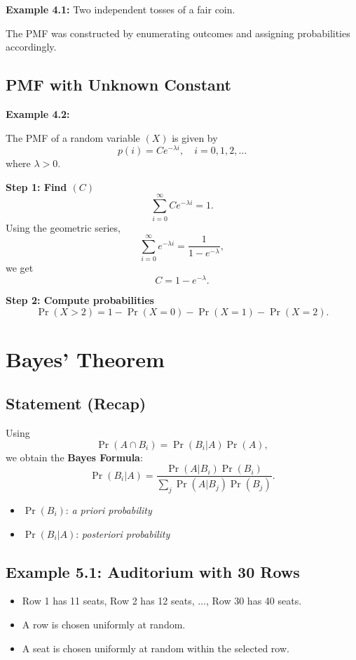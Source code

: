 \documentclass[11pt]{article}
\begin{document}
\textbf{Example 4.1:} Two independent tosses of a fair coin.

The PMF was constructed by enumerating outcomes and assigning probabilities
accordingly.

\subsection{PMF with Unknown Constant}

\textbf{Example 4.2:}

The PMF of a random variable $(X)$ is given by
\[
p(i) = C e^{-\lambda i}, \quad i = 0,1,2,\ldots
\]
where $\lambda > 0$.

\textbf{Step 1: Find $(C)$}
\[
\sum_{i=0}^{\infty} C e^{-\lambda i} = 1.
\]
Using the geometric series,
\[
\sum_{i=0}^{\infty} e^{-\lambda i} = \frac{1}{1 - e^{-\lambda}},
\]
we get
\[
C = 1 - e^{-\lambda}.
\]

\textbf{Step 2: Compute probabilities}
\[
\Pr(X>2) = 1 - \Pr(X=0) - \Pr(X=1) - \Pr(X=2).
\]

\section{Bayes' Theorem}

\subsection{Statement (Recap)}

Using
\[
\Pr(A \cap B_i) = \Pr(B_i | A)\Pr(A),
\]
we obtain the \textbf{Bayes Formula}:
\[
\Pr(B_i | A) =
\frac{\Pr(A | B_i)\Pr(B_i)}
{\sum_j \Pr(A | B_j)\Pr(B_j)}.
\]

\begin{itemize}
  \item $\Pr(B_i)$: \emph{a priori probability}
  \item $\Pr(B_i|A)$: \emph{posteriori probability}
\end{itemize}

\subsection{Example 5.1: Auditorium with 30 Rows}

\begin{itemize}
  \item Row 1 has 11 seats, Row 2 has 12 seats, $\ldots$, Row 30 has 40 seats.
  \item A row is chosen uniformly at random.
  \item A seat is chosen uniformly at random within the selected row.
\end{itemize}
\end{document}
